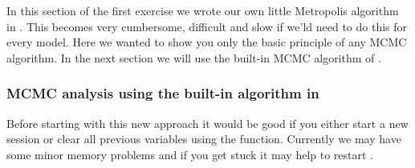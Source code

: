 In this section of the first exercise we wrote our own little Metropolis algorithm in \Rev.
This becomes very cumbersome, difficult and slow if we'ld need to do this for every model.
Here we wanted to show you only the basic principle of any MCMC algorithm.
In the next section we will use the built-in MCMC algorithm of \RevBayes.




\subsubsection{MCMC analysis using the built-in algorithm in \RevBayes}
Before starting with this new approach it would be good if you either start a new \RevBayes session or clear all previous variables using the  function.
Currently we may have some minor memory problems and if you get stuck it may help to restart \RevBayes.

